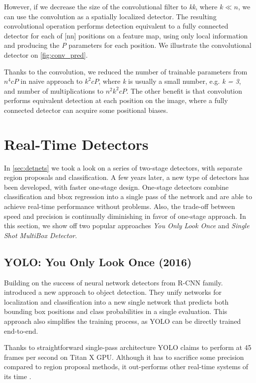 However, if we decrease the size of the convolutional filter to \textit{k\x k}, where $k \ll n$, we can use the convolution as a spatially localized detector. The resulting convolutional operation performs detection equivalent to a fully connected detector for each of [n\x n] positions on a feature map, using only local information and producing the \textit{P} parameters for each position. We illustrate the convolutional detector on \cref{fig:conv_pred}.

Thanks to the convolution, we reduced the number of trainable parameters from $n^4cP$ in naive approach to $k^2cP$, where \textit{k} is usually a small number, e.g. \textit{k = 3}, and number of multiplications to $n^2k^2cP$. The other benefit is that convolution performs equivalent detection at each position on the image, where a fully connected detector can acquire some positional biases.



\section{Real-Time Detectors}
\label{sec:rltm}
In \cref{sec:detnets} we took a look on a series of two-stage detectors, with separate region proposals and classification. A few years later, a new type of detectors has been developed, with faster one-stage design. One-stage detectors combine classification and bbox regression into a single pass of the network and are able to achieve real-time performance without problems. Also, the trade-off between speed and precision is continually diminishing in favor of one-stage approach. In this section, we show off two popular approaches \textit{You Only Look Once} and \textit{Single Shot MultiBox Detector}.

\subsection{YOLO: You Only Look Once (2016)}
\label{sec:yolo}
Building on the success of neural network detectors from R-CNN family. \citeauthor{bib:yolo} \cite{bib:yolo} introduced a new approach to object detection. They unify networks for localization and classification into a new single network that predicts both bounding box positions and class probabilities in a single evaluation. This approach also simplifies the training process, as YOLO can be directly trained end-to-end. 

Thanks to straightforward single-pass architecture YOLO claims to perform at 45 frames per second on Titan X GPU. Although it has to sacrifice some precision compared to region proposal methods, it out-performs other real-time systems of its time \cite{bib:overfeat}.


